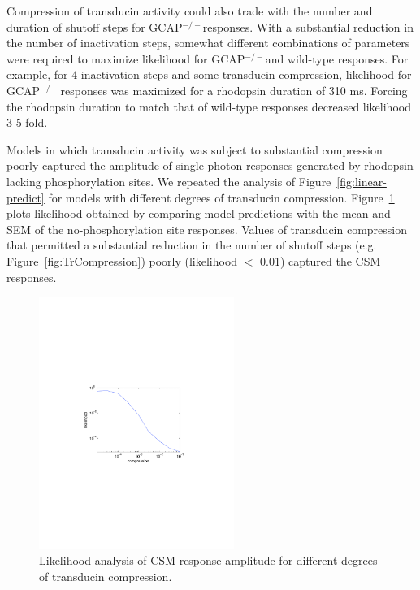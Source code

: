 \documentclass[12pt]{article}
\def\GCAPKO{GCAP$^{-/-}$}
\begin{document}
Compression of transducin activity could also trade with the number and duration of shutoff steps for \GCAPKO responses.  With a substantial reduction in the number of inactivation steps, somewhat different combinations of parameters were required to maximize likelihood for \GCAPKO and wild-type responses.  For example, for 4 inactivation steps and some transducin compression, likelihood for \GCAPKO responses was maximized for a rhodopsin duration of 310 ms.  Forcing the rhodopsin duration to match that of wild-type responses decreased likelihood 3-5-fold.  

Models in which transducin activity was subject to substantial compression poorly captured the amplitude of single photon responses generated by rhodopsin lacking phosphorylation sites.   We repeated the analysis of Figure~\ref{fig:linear-predict} for models with different degrees of transducin compression.  Figure~\ref{fig:TCompressCSM} plots likelihood obtained by comparing model predictions with the mean and SEM of the no-phosphorylation site responses.  Values of transducin compression that permitted a substantial reduction in the number of shutoff steps (e.g. Figure~\ref{fig:TrCompression}) poorly (likelihood $<$ 0.01) captured the CSM responses.  

\begin{figure}[h]
\begin{center}
\includegraphics[width=2.5in]{TCompressCSM.pdf}
\caption{Likelihood analysis of CSM response amplitude for different degrees of transducin compression.}
\label{fig:TCompressCSM}
\end{center}
\end{figure}


\end{document}
